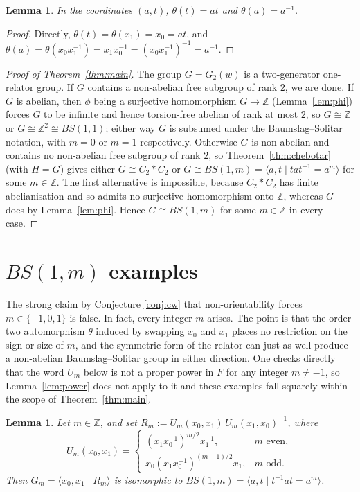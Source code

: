 \documentclass[a4paper,12pt,oneside]{article}
\newtheorem{lemma}[theorem]{Lemma}
\theoremstyle{definition}
\begin{document}
\begin{lemma}\label{lem:sigma-coords}
In the coordinates $(a,t)$, $\theta(t)=at$ and $\theta(a)=a^{-1}$.
\end{lemma}

\begin{proof}
Directly, $\theta(t)=\theta(x_1)=x_0=at$, and $\theta(a)=\theta(x_0x_1^{-1})=x_1x_0^{-1}=(x_0x_1^{-1})^{-1}=a^{-1}$.
\end{proof}
\begin{proof}[Proof of Theorem~\ref{thm:main}]
The group $G=G_2(w)$ is a two-generator one-relator group. If $G$ contains a non-abelian free subgroup of rank $2$, we are done. If $G$ is abelian, then $\phi$ being a surjective homomorphism $G\to\mathbb{Z}$ (Lemma~\ref{lem:phi}) forces $G$ to be infinite and hence torsion-free abelian of rank at most $2$, so $G\cong\mathbb{Z}$ or $G\cong\mathbb{Z}^2\cong BS(1,1)$; either way $G$ is subsumed under the Baumslag--Solitar notation, with $m=0$ or $m=1$ respectively. Otherwise $G$ is non-abelian and contains no non-abelian free subgroup of rank $2$, so Theorem~\ref{thm:chebotar} (with $H=G$) gives either $G\cong C_2*C_2$ or $G\cong BS(1,m)=\langle a,t\mid tat^{-1}=a^m\rangle$ for some $m\in\mathbb{Z}$. The first alternative is impossible, because $C_2*C_2$ has finite abelianisation and so admits no surjective homomorphism onto $\mathbb{Z}$, whereas $G$ does by Lemma~\ref{lem:phi}. Hence $G\cong BS(1,m)$ for some $m\in\mathbb{Z}$ in every case.
\end{proof}

\section{$BS(1,m)$ examples}
\label{sec:gap}

The strong claim by Conjecture \ref{conj:cw} that non-orientability forces $m\in \{-1,0,1\}$ is false.  In fact, every integer $m$ arises. The point is that the order-two automorphism $\theta$ induced by swapping $x_0$ and $x_1$ places no restriction on the sign or size of $m$, and the symmetric form of the relator can just as well produce a non-abelian Baumslag--Solitar group in either direction. One checks directly that the word $U_m$ below is not a proper power in $F$ for any integer $m\neq -1$, so Lemma~\ref{lem:power} does not apply to it and these examples fall squarely within the scope of Theorem~\ref{thm:main}.

\begin{lemma}\label{lem:BSm-example}
Let $m \in \mathbb{Z}$, and set $R_m := U_m(x_0,x_1)\,U_m(x_1,x_0)^{-1}$, where
\[
U_m(x_0,x_1) =
\begin{cases}
(x_1 x_0^{-1})^{m/2} x_1^{-1}, & m \text{ even}, \\[2pt]
x_0 (x_1 x_0^{-1})^{(m-1)/2} x_1, & m \text{ odd}.
\end{cases}
\]
Then $G_m =\langle x_0, x_1 \mid R_m \rangle$ is isomorphic to $BS(1,m) = \langle a, t \mid t^{-1} a t = a^m \rangle$.
\end{lemma}
\end{document}
